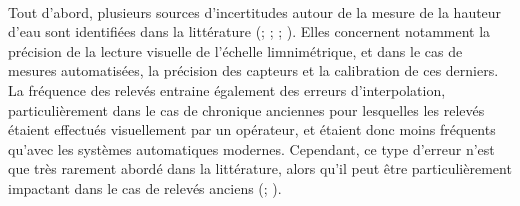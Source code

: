 \documentclass[11pt]{article}
\begin{document}
	\paragraph{} Tout d'abord, plusieurs sources d'incertitudes autour de la mesure de la hauteur d'eau sont identifiées dans la littérature (\citet{van_der_made_determination_1982}; \citet{petersen-overleir_uncertainty_2005}; \citet{mcmillan_benchmarking_2012}; \citet{horner_impact_2018}). Elles concernent notamment la précision de la lecture visuelle de l'échelle limnimétrique, et dans le cas de mesures automatisées, la précision des capteurs et la calibration de ces derniers. La fréquence des relevés entraine également des erreurs d'interpolation, particulièrement dans le cas de chronique anciennes pour lesquelles les relevés étaient effectués visuellement par un opérateur, et étaient donc moins fréquents qu'avec les systèmes automatiques modernes. Cependant, ce type d'erreur n'est que très rarement abordé dans la littérature, alors qu'il peut être particulièrement impactant dans le cas de relevés anciens (\citet{hamilton_quantifying_2012}; \citet{kuentz_hydrometrie_2014}).
	
\end{document}
